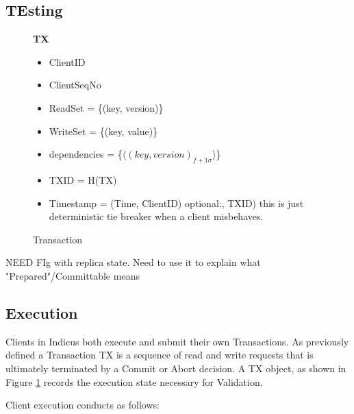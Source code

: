 \subsection{TEsting}
\begin{figure}[t]
  \begin{mdframed}[roundcorner=10pt]
 	\textbf{TX}
 	\begin{itemize}
 	\item ClientID
 	\item ClientSeqNo
 	\item ReadSet = \{(key, version)\}
 	\item WriteSet = \{(key, value)\}
 	\item dependencies = \{$\langle (key, version)_{f+1 \sigma} \rangle$\}
 	\item TXID = H(TX)
 	\item Timestamp = (Time, ClientID)  optional:, TXID) this is just deterministic tie breaker when a client misbehaves.
 	\end{itemize}
  \end{mdframed}
  \caption{Transaction}
  \label{fig:TX}
\end{figure}


NEED FIg with replica state. Need to use it to explain what "Prepared"/Committable means
\subsection{Execution}
Clients in Indicus both execute and submit their own Transactions. As previously defined a Transaction TX is a sequence of read and write requests that is ultimately terminated by a Commit or Abort decision. A TX object, as shown in Figure \ref{fig:TX} records the execution state necessary for Validation.

Client execution conducts as follows:\\

